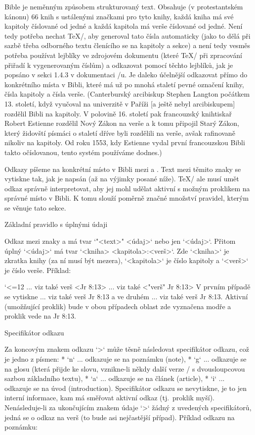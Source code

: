 Bible je neměnným způsobem
strukturovaný text. Obsahuje (v protestantském kánonu) 66 knih s ustálenými značkami pro tyto knihy,
každá kniha má své kapitoly číslované od jedné a každá kapitola má verše
číslované od jedné. Není tedy potřeba nechat \TeX/, aby generoval tato čísla
automaticky (jako to dělá při sazbě třeba odborného textu členícího se na
kapitoly a sekce) a není tedy vesměs potřeba používat lejblíky ve zdrojovém
dokumentu (které \TeX/ při zpracování přiřadí k vygenerovaným číslům) a odkazovat pomocí
těchto lejblíků, jak je popsáno v sekci 1.4.3 v dokumentaci \OpTeX/u. Je
daleko účelnější odkazovat přímo do konkrétního místa v Bibli, které má už
po mnohá staletí pevné označení knihy, čísla kapitoly a čísla verše.
(Canterburský arcibiskup Stephen Langton  počátkem 13. století, když vyučoval na univerzitě v Paříži  [a ještě nebyl arcibiskupem]
rozdělil Bibli na kapitoly. 
V polovině 16. století pak francouzský knihtiskař Robert Estienne rozdělil Nový Zákon na verše a k tomu připojil Starý Zákon,
který  židovští písmáci o staletí dříve byli rozdělili na verše, avšak rafinovaně nikoliv na kapitoly.
Od roku 1553, kdy Estienne vydal první francouzskou Bibli takto očíslovanou, tento systém používáme dodnes.)


Odkazy píšeme na konkrétní místo v Bibli mezi \code{<} a \code{>}. Text mezi
těmito znaky se vytiskne tak, jak je napsán (až na výjimky posané níže). 
\TeX/ ale musí umět odkaz správně interpretovat, aby jej mohl
udělat aktivní s možným proklikem na správné místo v Bibli. K tomu slouží
poměrně značné množství pravidel, kterým se věnuje tato sekce.

\secc[uudaj] Základní pravidlo s úplnými údaji

Odkaz mezi znaky \code{<} a \code{>} má tvar `"<text>" <údaj>` nebo jen
`<údaj>`. Přitom úplný `<údaj>` má tvar
`<kniha> <kapitola>:<verš>`. Zde `<kniha>` je zkratka knihy (za ní musí být
mezera), `<kapitola>` je číslo kapitoly a `<verš>` je číslo verše.
Příklad:

\begtt \catcode`<=12
... viz také verš <Jr 8:13>
... viz také <"verš" Jr 8:13>
\endtt
V prvním případě se vytiskne ... viz také verš {\Blue Jr 8:13} a ve druhém
... viz také {\Blue verš Jr 8:13}. Aktivní (umožňující proklik) bude v obou případech
oblast zde vyznačena modře a proklik vede na Jr 8:13.

\secc Specifikátor odkazu

Za koncovým znakem odkazu `>` může těsně následovat specifikátor odkazu, což
je jedno z písmen:
\begitems
* `n` ... odkazuje se na poznámku (note),
* `g` ... odkazuje se na glosu (která přijde ke slovu, vznikne-li někdy další verze \OpBible/ s dvousloupcovou sazbou základního textu),
* `a` ... odkazuje se na článek (article),
* `i` ... odkazuje se na úvod (introduction).
\enditems
Specifikátor odkazu se nevytiskne, je to jen interní informace, kam má
směřovat aktivní odkaz (tj.~proklik myší). Nenásleduje-li za ukončujícím
znakem údaje `>` žádný z uvedených specifikátorů, jedná se o odkaz na verš
(to bude asi nejčastější případ).
Příklad odkazu na poznámku:

